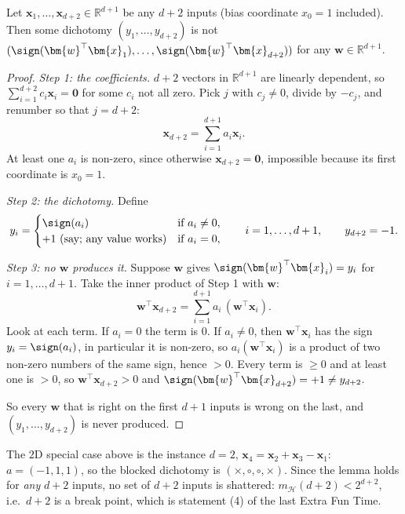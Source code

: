 \begin{lemma}\label{lem:dep-block}
    Let \(\bm{x}_1, \dots , \bm{x}_{d+2} \in \mathbb{R}^{d+1}\) be any
    \(d + 2\) inputs (bias coordinate \(x_0 = 1\) included). Then some
    dichotomy \((y_1, \dots , y_{d+2})\) is not \((\sign(\bm{w}^\top
    \bm{x}_1), \dots , \sign(\bm{w}^\top \bm{x}_{d+2}))\) for any
    \(\bm{w} \in \mathbb{R}^{d+1}\).
\end{lemma}

\begin{proof}
    \emph{Step 1: the coefficients.} \(d + 2\) vectors in
    \(\mathbb{R}^{d+1}\) are linearly dependent, so \(\sum_{i=1}^{d+2} c_i
    \bm{x}_i = \bm{0}\) for some \(c_i\) not all zero. Pick \(j\) with \(c_j
    \ne 0\), divide by \(-c_j\), and renumber so that \(j = d + 2\):
    \[
        \bm{x}_{d+2} = \sum_{i=1}^{d+1} a_i \bm{x}_i .
    \]
    At least one \(a_i\) is non-zero, since otherwise \(\bm{x}_{d+2} =
    \bm{0}\), impossible because its first coordinate is \(x_0 = 1\).

    \emph{Step 2: the dichotomy.} Define
    \[
        y_i = \begin{cases}
            \sign(a_i) & \text{if } a_i \ne 0,\\
            +1 \text{ (say; any value works)} & \text{if } a_i = 0,
        \end{cases}
        \qquad i = 1, \dots , d + 1, \qquad y_{d+2} = -1 .
    \]

    \emph{Step 3: no \(\bm{w}\) produces it.} Suppose \(\bm{w}\) gives
    \(\sign(\bm{w}^\top \bm{x}_i) = y_i\) for \(i = 1, \dots , d + 1\). Take
    the inner product of Step 1 with \(\bm{w}\):
    \[
        \bm{w}^\top \bm{x}_{d+2} = \sum_{i=1}^{d+1} a_i \,
        (\bm{w}^\top \bm{x}_i) .
    \]
    Look at each term. If \(a_i = 0\) the term is \(0\). If \(a_i \ne 0\),
    then \(\bm{w}^\top \bm{x}_i\) has the sign \(y_i = \sign(a_i)\), in
    particular it is non-zero, so \(a_i (\bm{w}^\top \bm{x}_i)\) is a product
    of two non-zero numbers of the same sign, hence \(> 0\). Every term is
    \(\ge 0\) and at least one is \(> 0\), so \(\bm{w}^\top \bm{x}_{d+2} >
    0\) and \(\sign(\bm{w}^\top \bm{x}_{d+2}) = +1 \ne y_{d+2}\).

    So every \(\bm{w}\) that is right on the first \(d + 1\) inputs is wrong
    on the last, and \((y_1, \dots , y_{d+2})\) is never produced.
\end{proof}

The \(2\)D special case above is the instance \(d = 2\), \(\bm{x}_4 =
\bm{x}_2 + \bm{x}_3 - \bm{x}_1\): \(a = (-1, 1, 1)\), so the blocked dichotomy
is \((\times, \circ, \circ, \times)\). Since the lemma holds for \emph{any}
\(d + 2\) inputs, no set of \(d + 2\) inputs is shattered: \(m_{\mathcal{H}}(d
+ 2) < 2^{d+2}\), i.e.\ \(d + 2\) is a break point, which is statement (4) of
the last Extra Fun Time.

